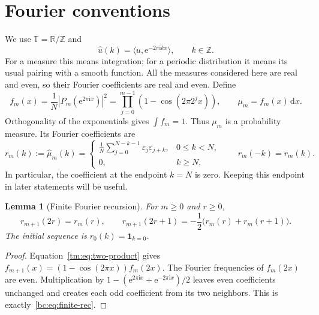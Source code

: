 \documentclass[11pt,a4paper,oneside,openany]{book}
\numberwithin{equation}{chapter}
\newtheorem{lemma}[theorem]{Lemma}
\theoremstyle{definition}
\theoremstyle{remark}
\newcommand{\eps}{\varepsilon}
\newcommand{\T}{\mathbb T}
\newcommand{\Z}{\mathbb Z}
\newcommand{\R}{\mathbb R}
\newcommand{\dd}{\,\mathrm d}
\newcommand{\ee}{\mathrm e}
\newcommand{\ii}{\mathrm i}
\newcommand{\abs}[1]{\left\lvert #1\right\rvert}
\newcommand{\pair}[2]{\langle #1,#2\rangle}
\begin{document}
\section{Fourier conventions}
We use $\T=\R/\Z$ and
\begin{equation}
 \widehat u(k)=\pair{u}{\ee^{-2\pi\ii kx}},\qquad k\in\Z.
 \label{bc:eq:fourier}
\end{equation}
For a measure this means integration; for a periodic distribution it means its
usual pairing with a smooth function. All the measures considered here are real
and even, so their Fourier coefficients are real and even. Define
\begin{equation}
 f_m(x)=\frac1N\abs{P_m(\ee^{2\pi\ii x})}^2
       =\prod_{j=0}^{m-1}(1-\cos(2\pi2^jx)),\qquad
 \mu_m=f_m(x)\dd x.
 \label{bc:eq:fm}
\end{equation}
Orthogonality of the exponentials gives $\int f_m=1$. Thus $\mu_m$ is a
probability measure. Its Fourier coefficients are
\begin{equation}
 r_m(k):=\widehat\mu_m(k)
 =\begin{cases}
 \displaystyle\frac1N\sum_{j=0}^{N-k-1}\eps_j\eps_{j+k},&0\le k<N,\\
 0,&k\ge N,
 \end{cases}\qquad r_m(-k)=r_m(k).
 \label{bc:eq:aperiodic}
\end{equation}
In particular, the coefficient at the endpoint $k=N$ is zero. Keeping this
endpoint in later statements will be useful.

\begin{lemma}[Finite Fourier recursion]
\label{bc:lem:finite-rec}
For $m\ge0$ and $r\ge0$,
\begin{equation}
 r_{m+1}(2r)=r_m(r),\qquad
 r_{m+1}(2r+1)=-\frac12\bigl(r_m(r)+r_m(r+1)\bigr).
 \label{bc:eq:finite-rec}
\end{equation}
The initial sequence is $r_0(k)=\mathbf1_{k=0}$.
\end{lemma}
\begin{proof}
Equation~\eqref{tm:eq:two-product} gives
$f_{m+1}(x)=(1-\cos(2\pi x))f_m(2x)$. The Fourier frequencies of $f_m(2x)$
are even. Multiplication by $1-(\ee^{2\pi\ii x}+\ee^{-2\pi\ii x})/2$ leaves
even coefficients unchanged and creates each odd coefficient from its two
neighbors. This is exactly~\eqref{bc:eq:finite-rec}.
\end{proof}
\end{document}
